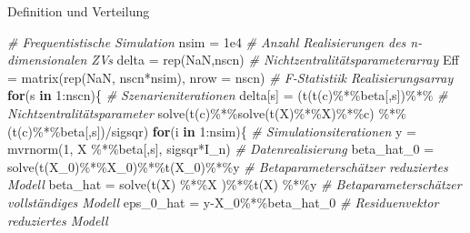 \documentclass[
  8pt,
  ignorenonframetext,
]{beamer}
\newenvironment{Shaded}{\begin{snugshade}}{\end{snugshade}}
\newcommand{\AttributeTok}[1]{\textcolor[rgb]{0.77,0.63,0.00}{#1}}
\newcommand{\CommentTok}[1]{\textcolor[rgb]{0.56,0.35,0.01}{\textit{#1}}}
\newcommand{\ConstantTok}[1]{\textcolor[rgb]{0.00,0.00,0.00}{#1}}
\newcommand{\ControlFlowTok}[1]{\textcolor[rgb]{0.13,0.29,0.53}{\textbf{#1}}}
\newcommand{\DecValTok}[1]{\textcolor[rgb]{0.00,0.00,0.81}{#1}}
\newcommand{\FloatTok}[1]{\textcolor[rgb]{0.00,0.00,0.81}{#1}}
\newcommand{\FunctionTok}[1]{\textcolor[rgb]{0.00,0.00,0.00}{#1}}
\newcommand{\NormalTok}[1]{#1}
\newcommand{\OtherTok}[1]{\textcolor[rgb]{0.56,0.35,0.01}{#1}}
\newcommand{\SpecialCharTok}[1]{\textcolor[rgb]{0.00,0.00,0.00}{#1}}
\begin{document}
\begin{frame}[fragile]{Definition und Verteilung}
\begin{Shaded}
\begin{Highlighting}[]
\CommentTok{\# Frequentistische Simulation}
\NormalTok{nsim   }\OtherTok{=} \FloatTok{1e4}                                                \CommentTok{\# Anzahl Realisierungen des n{-}dimensionalen ZVs}
\NormalTok{delta  }\OtherTok{=} \FunctionTok{rep}\NormalTok{(}\ConstantTok{NaN}\NormalTok{,nscn)                                      }\CommentTok{\# Nichtzentralitätsparameterarray}
\NormalTok{Eff    }\OtherTok{=} \FunctionTok{matrix}\NormalTok{(}\FunctionTok{rep}\NormalTok{(}\ConstantTok{NaN}\NormalTok{, nscn}\SpecialCharTok{*}\NormalTok{nsim), }\AttributeTok{nrow =}\NormalTok{ nscn)           }\CommentTok{\# F{-}Statistiik Realisierungsarray}
\ControlFlowTok{for}\NormalTok{(s }\ControlFlowTok{in} \DecValTok{1}\SpecialCharTok{:}\NormalTok{nscn)\{                                           }\CommentTok{\# Szenarieniterationen}
\NormalTok{  delta[s] }\OtherTok{=}\NormalTok{ (}\FunctionTok{t}\NormalTok{(}\FunctionTok{t}\NormalTok{(c)}\SpecialCharTok{\%*\%}\NormalTok{beta[,s])}\SpecialCharTok{\%*\%}                         \CommentTok{\# Nichtzentralitätsparameter}
              \FunctionTok{solve}\NormalTok{(}\FunctionTok{t}\NormalTok{(c)}\SpecialCharTok{\%*\%}\FunctionTok{solve}\NormalTok{(}\FunctionTok{t}\NormalTok{(X)}\SpecialCharTok{\%*\%}\NormalTok{X)}\SpecialCharTok{\%*\%}\NormalTok{c) }\SpecialCharTok{\%*\%}
\NormalTok{              (}\FunctionTok{t}\NormalTok{(c)}\SpecialCharTok{\%*\%}\NormalTok{beta[,s])}\SpecialCharTok{/}\NormalTok{sigsqr)}
  \ControlFlowTok{for}\NormalTok{(i }\ControlFlowTok{in} \DecValTok{1}\SpecialCharTok{:}\NormalTok{nsim)\{                                         }\CommentTok{\# Simulationsiterationen}
\NormalTok{    y               }\OtherTok{=} \FunctionTok{mvrnorm}\NormalTok{(}\DecValTok{1}\NormalTok{, X }\SpecialCharTok{\%*\%}\NormalTok{beta[,s], sigsqr}\SpecialCharTok{*}\NormalTok{I\_n) }\CommentTok{\# Datenrealisierung}
\NormalTok{    beta\_hat\_0      }\OtherTok{=} \FunctionTok{solve}\NormalTok{(}\FunctionTok{t}\NormalTok{(X\_0)}\SpecialCharTok{\%*\%}\NormalTok{X\_0)}\SpecialCharTok{\%*\%}\FunctionTok{t}\NormalTok{(X\_0)}\SpecialCharTok{\%*\%}\NormalTok{y      }\CommentTok{\# Betaparameterschätzer reduziertes Modell}
\NormalTok{    beta\_hat        }\OtherTok{=} \FunctionTok{solve}\NormalTok{(}\FunctionTok{t}\NormalTok{(X)  }\SpecialCharTok{\%*\%}\NormalTok{X  )}\SpecialCharTok{\%*\%}\FunctionTok{t}\NormalTok{(X)  }\SpecialCharTok{\%*\%}\NormalTok{y      }\CommentTok{\# Betaparameterschätzer vollständiges Modell}
\NormalTok{    eps\_0\_hat       }\OtherTok{=}\NormalTok{ y}\SpecialCharTok{{-}}\NormalTok{X\_0}\SpecialCharTok{\%*\%}\NormalTok{beta\_hat\_0                    }\CommentTok{\# Residuenvektor reduziertes Modell}

\end{Highlighting}
\end{Shaded}
\end{frame}
\end{document}
